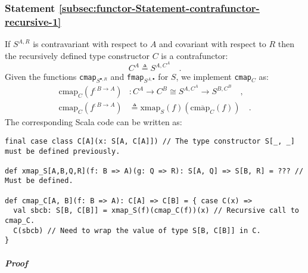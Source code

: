 \subsubsection{Statement \label{subsec:functor-Statement-contrafunctor-recursive-1}\ref{subsec:functor-Statement-contrafunctor-recursive-1}}

If $S^{A,R}$ is contravariant with respect to $A$ and covariant
with respect to $R$ then the recursively defined type constructor
$C$ is a contrafunctor:
\[
C^{A}\triangleq S^{A,C^{A}}\quad.
\]
Given the functions \lstinline!cmap!$_{S^{\bullet,R}}$ and \lstinline!fmap!$_{S^{A,\bullet}}$
for $S$, we implement \lstinline!cmap!$_{C}$ as:
\begin{align*}
\text{cmap}_{C}(f^{:B\rightarrow A}) & :C^{A}\rightarrow C^{B}\cong S^{A,C^{A}}\rightarrow S^{B,C^{B}}\quad,\\
\text{cmap}_{C}(f^{:B\rightarrow A}) & \triangleq\text{xmap}_{S}(f)(\overline{\text{cmap}_{C}}(f))\quad.
\end{align*}
The corresponding Scala code can be written as:
\begin{lstlisting}
final case class C[A](x: S[A, C[A]]) // The type constructor S[_, _] must be defined previously.

def xmap_S[A,B,Q,R](f: B => A)(g: Q => R): S[A, Q] => S[B, R] = ??? // Must be defined.

def cmap_C[A, B](f: B => A): C[A] => C[B] = { case C(x) =>
  val sbcb: S[B, C[B]] = xmap_S(f)(cmap_C(f))(x) // Recursive call to cmap_C.
  C(sbcb) // Need to wrap the value of type S[B, C[B]] in C.
}
\end{lstlisting}


\subparagraph{Proof}

